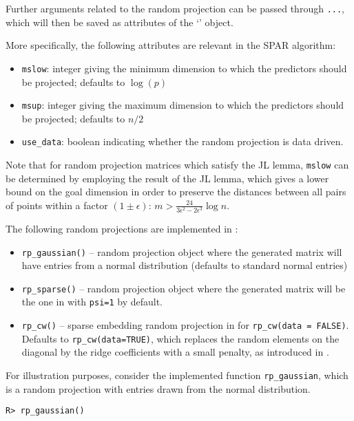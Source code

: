 \documentclass[
  article]{jss}
\newcommand{\class}[1]{`\code{#1}'}
\begin{document}
Further arguments related to the random projection can be passed through
\texttt{...}, which will then be saved as attributes of the
\class{randomprojection} object.

More specifically, the following attributes are relevant in the SPAR
algorithm:

\begin{itemize}
\item
  \texttt{mslow}: integer giving the minimum dimension to which the
  predictors should be projected; defaults to \(\log(p)\)
\item
  \texttt{msup}: integer giving the maximum dimension to which the
  predictors should be projected; defaults to \(n/2\)
\item
  \texttt{use\_data}: boolean indicating whether the random projection
  is data driven.
\end{itemize}

Note that for random projection matrices which satisfy the JL lemma,
\texttt{mslow} can be determined by employing the result of the JL
lemma, which gives a lower bound on the goal dimension in order to
preserve the distances between all pairs of points within a factor
\((1 \pm \epsilon)\): \(m>\frac{24}{3\epsilon^2-2\epsilon^3}\log n\).

The following random projections are implemented in :

\begin{itemize}
\item
  \texttt{rp\_gaussian()} -- random projection object where the
  generated matrix will have entries from a normal distribution
  (defaults to standard normal entries)
\item
  \texttt{rp\_sparse()} -- random projection object where the generated
  matrix will be the one in \citep{ACHLIOPTAS2003JL} with \texttt{psi=1}
  by default.
\item
  \texttt{rp\_cw()} -- sparse embedding random projection in
  \citep{Clarkson2013LowRankApprox} for \texttt{rp\_cw(data\ =\ FALSE)}.
  Defaults to \texttt{rp\_cw(data=TRUE)}, which replaces the random
  elements on the diagonal by the ridge coefficients with a small
  penalty, as introduced in \citet{parzer2024glms}.
\end{itemize}

For illustration purposes, consider the implemented function
\texttt{rp\_gaussian}, which is a random projection with entries drawn
from the normal distribution.

\begin{verbatim}
R> rp_gaussian()
\end{verbatim}
\end{document}
